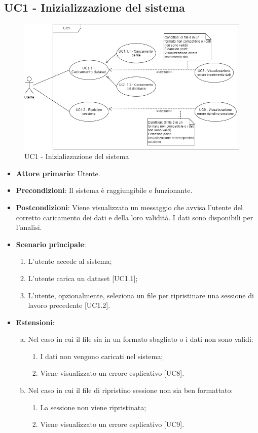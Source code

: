 \subsection{UC1 - Inizializzazione del sistema}
\begin{figure}[h]
\includegraphics[width=\linewidth]{../Images/UC1.png}
\centering
\caption{UC1 - Inizializzazione del sistema}
\end{figure}
\begin{itemize}
	\item \textbf{Attore primario}: Utente.
	\item \textbf{Precondizioni}: Il sistema è raggiungibile e funzionante.
	\item \textbf{Postcondizioni}: Viene visualizzato un messaggio che avvisa l'utente del corretto caricamento dei dati e della loro validità. I dati sono disponibili per l'analisi.
	\item \textbf{Scenario principale}:
		\begin{enumerate}
			\item L'utente accede al sistema;
			\item L'utente carica un dataset [UC1.1];
			\item L'utente, opzionalmente, seleziona un file per ripristinare una sessione di lavoro precedente [UC1.2].
			
		\end{enumerate}
	\item \textbf{Estensioni}:
	\begin{enumerate}[(a)]
		\item Nel caso in cui il file sia in un formato sbagliato o i dati non sono validi:
		\begin{enumerate}[1.]
			\item I dati non vengono caricati nel sistema;
			\item Viene visualizzato un errore esplicativo [UC8].
		\end{enumerate}
		
		\item Nel caso in cui il file di ripristino sessione non sia ben formattato:
		\begin{enumerate}[1.]
			\item La sessione non viene ripristinata;
			\item Viene visualizzato un errore esplicativo [UC9].
		\end{enumerate}
	\end{enumerate}
\end{itemize}






  